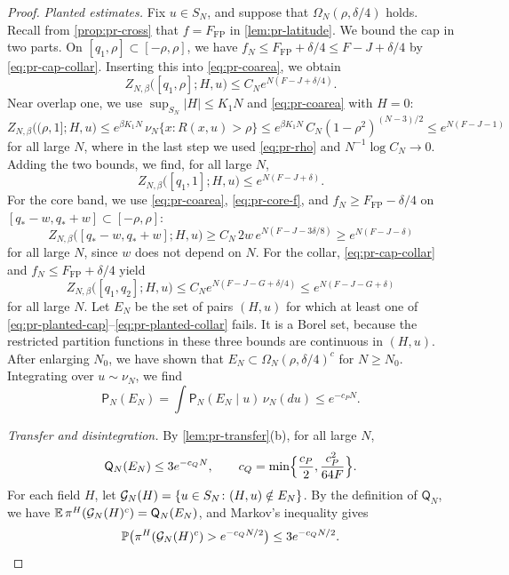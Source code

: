 \begin{proof}
\emph{Planted estimates.} Fix $u\in S_N$, and suppose that $\Omega_N(\rho,\delta/4)$ holds. Recall from \cref{prop:pr-cross} that $f=F_{\mathrm{FP}}$ in \cref{lem:pr-latitude}. We bound the cap in two parts. On $[q_1,\rho]\subset[-\rho,\rho]$, we have $f_N\le F_{\mathrm{FP}}+\delta/4\le F-J+\delta/4$ by \eqref{eq:pr-cap-collar}. Inserting this into \eqref{eq:pr-coarea}, we obtain
\[
Z_{N,\beta}\bigl([q_1,\rho];H,u\bigr)\le C_Ne^{N(F-J+\delta/4)} .
\]
Near overlap one, we use $\sup_{S_N}|H|\le K_1N$ and \eqref{eq:pr-coarea} with $H=0$:
\[
Z_{N,\beta}\bigl((\rho,1];H,u\bigr)\le e^{\beta K_1N}\,\nu_N\{x\colon R(x,u)>\rho\}\le e^{\beta K_1N}\,C_N(1-\rho^2)^{(N-3)/2}\le e^{N(F-J-1)}
\]
for all large $N$, where in the last step we used \eqref{eq:pr-rho} and $N^{-1}\log C_N\to0$. Adding the two bounds, we find, for all large $N$,
\begin{equation}\label{eq:pr-planted-cap}
Z_{N,\beta}\bigl([q_1,1];H,u\bigr)\le e^{N(F-J+\delta)} .
\end{equation}
For the core band, we use \eqref{eq:pr-coarea}, \eqref{eq:pr-core-f}, and $f_N\ge F_{\mathrm{FP}}-\delta/4$ on $[q_*-w,q_*+w]\subset[-\rho,\rho]$:
\begin{equation}\label{eq:pr-planted-core}
Z_{N,\beta}\bigl([q_*-w,q_*+w];H,u\bigr)\ge C_N\,2w\,e^{N(F-J-3\delta/8)}\ge e^{N(F-J-\delta)}
\end{equation}
for all large $N$, since $w$ does not depend on $N$. For the collar, \eqref{eq:pr-cap-collar} and $f_N\le F_{\mathrm{FP}}+\delta/4$ yield
\begin{equation}\label{eq:pr-planted-collar}
Z_{N,\beta}\bigl([q_1,q_2];H,u\bigr)\le C_Ne^{N(F-J-G+\delta/4)}\le e^{N(F-J-G+\delta)}
\end{equation}
for all large $N$. Let $E_N$ be the set of pairs $(H,u)$ for which at least one of \eqref{eq:pr-planted-cap}--\eqref{eq:pr-planted-collar} fails. It is a Borel set, because the restricted partition functions in these three bounds are continuous in $(H,u)$. After enlarging $N_0$, we have shown that $E_N\subset\Omega_N(\rho,\delta/4)^c$ for $N\ge N_0$. Integrating over $u\sim\nu_N$, we find
\[
\mathsf P_N(E_N)=\int\mathsf P_N(E_N\mid u)\,\nu_N(du)\le e^{-c_PN} .
\]

\emph{Transfer and disintegration.} By \cref{lem:pr-transfer}(b), for all large $N$,
\[
\mathsf Q_N(E_N)\le3e^{-c_QN},\qquad c_Q=\min\Bigl\{\frac{c_P}2,\frac{c_P^2}{64F}\Bigr\}.
\]
For each field $H$, let $\mathcal G_N(H)=\{u\in S_N\colon(H,u)\notin E_N\}$. By the definition of $\mathsf Q_N$, we have $\mathbb E\,\pi^H(\mathcal G_N(H)^c)=\mathsf Q_N(E_N)$, and Markov's inequality gives
\[
\mathbb P\bigl(\pi^H(\mathcal G_N(H)^c)>e^{-c_QN/2}\bigr)\le3e^{-c_QN/2} .
\]


\end{proof}
